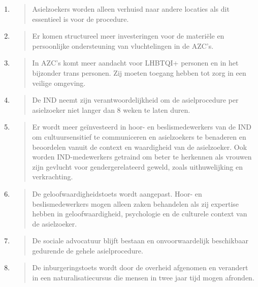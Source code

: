 \begin{enumerate}
\def\labelenumi{\arabic{enumi}.}
\item
  \begin{quote}
  Asielzoekers worden alleen verhuisd naar andere locaties als dit
  essentieel is voor de procedure.
  \end{quote}
\item
  \begin{quote}
  Er komen structureel meer investeringen voor de materiële en
  persoonlijke ondersteuning van vluchtelingen in de AZC's.
  \end{quote}
\item
  \begin{quote}
  In AZC's komt meer aandacht voor LHBTQI+ personen en in het bijzonder
  trans personen. Zij moeten toegang hebben tot zorg in een veilige
  omgeving.
  \end{quote}
\item
  \begin{quote}
  De IND neemt zijn verantwoordelijkheid om de asielprocedure per
  asielzoeker niet langer dan 8 weken te laten duren.
  \end{quote}
\item
  \begin{quote}
  Er wordt meer geïnvesteerd in hoor- en beslismedewerkers van de IND om
  cultuursensitief te communiceren en asielzoekers te benaderen en
  beoordelen vanuit de context en waardigheid van de asielzoeker. Ook
  worden IND-medewerkers getraind om beter te herkennen als vrouwen zijn
  gevlucht voor gendergerelateerd geweld, zoals uithuwelijking en
  verkrachting.
  \end{quote}
\item
  \begin{quote}
  De geloofwaardigheidstoets wordt aangepast. Hoor- en beslismedewerkers
  mogen alleen zaken behandelen als zij expertise hebben in
  geloofwaardigheid, psychologie en de culturele context van de
  asielzoeker.
  \end{quote}
\item
  \begin{quote}
  De sociale advocatuur blijft bestaan en onvoorwaardelijk beschikbaar
  gedurende de gehele asielprocedure.
  \end{quote}
\item
  \begin{quote}
  De inburgeringstoets wordt door de overheid afgenomen en verandert in
  een naturalisatiecursus die mensen in twee jaar tijd mogen afronden.

\end{quote}
\end{enumerate}
